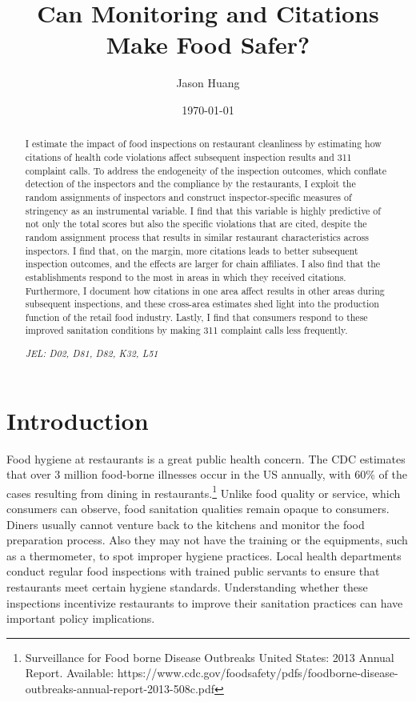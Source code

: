 \documentclass[12pt]{article}
\title{\textbf{Can Monitoring and Citations Make Food Safer?}}
\author{Jason Huang}
\date{\bigskip \today}
\begin{document}
\newcommand{\cfbox}[2]{%
    \colorlet{currentcolor}{.}%
    {\color{#1}%
    \fbox{\color{currentcolor}#2}}%
}

\maketitle

\begin{abstract}

I estimate the impact of food inspections on restaurant cleanliness by estimating how citations of health code violations affect subsequent inspection results and 311 complaint calls. To address the endogeneity of the inspection outcomes, which conflate detection of the inspectors and the compliance by the restaurants, I exploit the random assignments of inspectors and construct inspector-specific measures of stringency as an instrumental variable. I find that this variable is highly predictive of not only the total scores but also the specific violations that are cited, despite the random assignment process that results in similar restaurant characteristics across inspectors. I find that, on the margin, more citations leads to better subsequent inspection outcomes, and the effects are larger for chain affiliates. I also find that the establishments respond to the most in areas in which they received citations. Furthermore, I document how citations in one area affect results in other areas during subsequent inspections, and these cross-area estimates shed light into the production function of the retail food industry. Lastly, I find that consumers respond to these improved sanitation conditions by making 311 complaint calls less frequently. 

\textit{JEL: D02, D81, D82, K32, L51}\\
\end{abstract}
\thispagestyle{empty} \newpage

\onehalfspacing \setcounter{page}{1}

\section{Introduction}

Food hygiene at restaurants is a great public health concern. The CDC estimates that over 3 million food-borne illnesses occur in the US annually, with 60\% of the cases resulting from dining in restaurants.\footnote{Surveillance for Food borne Disease Outbreaks United States: 2013 Annual Report. Available: https://www.cdc.gov/foodsafety/pdfs/foodborne-disease-outbreaks-annual-report-2013-508c.pdf} Unlike food quality or service, which consumers can observe, food sanitation qualities remain opaque to consumers. Diners usually cannot venture back to the kitchens and monitor the food preparation process. Also they may not have the training or the equipments, such as a thermometer, to spot improper hygiene practices. Local health departments conduct regular food inspections with trained public servants to ensure that restaurants meet certain hygiene standards. Understanding whether these inspections incentivize restaurants to improve their sanitation practices can have important policy implications.
\end{document}
